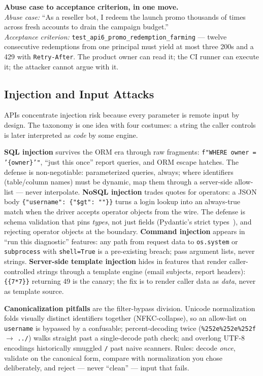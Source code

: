 \begin{examplebox}
\textbf{Abuse case to acceptance criterion, in one move.}\\
\emph{Abuse case:} ``As a reseller bot, I redeem the launch promo
thousands of times across fresh accounts to drain the campaign budget.''\\
\emph{Acceptance criterion:} \texttt{test\_api6\_promo\_redemption\_farming}
--- twelve consecutive redemptions from one principal must yield at most
three 200s and a 429 with \texttt{Retry-After}. The product owner can read
it; the CI runner can execute it; the attacker cannot argue with it.
\end{examplebox}

\subsection{Injection and Input Attacks}
\label{sec:ch16-injection}

APIs concentrate injection risk because every parameter is remote input by
design. The taxonomy is one idea with four costumes: a string the caller
controls is later interpreted as \emph{code} by some engine.

\textbf{SQL injection} survives the ORM era through raw fragments:
\texttt{f"WHERE owner = '\{owner\}'"}, ``just this once'' report queries,
and ORM escape hatches. The defense is non-negotiable: parameterized
queries, always; where identifiers (table/column names) must be dynamic,
map them through a server-side allow-list --- never interpolate.
\textbf{NoSQL injection} trades quotes for operators: a JSON body
\texttt{\{"username": \{"\$gt": ""\}\}} turns a login lookup into an
always-true match when the driver accepts operator objects from the wire.
The defense is schema validation that pins \emph{types}, not just fields
(Pydantic's strict types~\cite{pydanticdocs}), and rejecting operator
objects at the boundary. \textbf{Command injection} appears in ``run this
diagnostic'' features: any path from request data to \texttt{os.system} or
\texttt{subprocess} with \texttt{shell=True} is a pre-existing breach;
pass argument lists, never strings. \textbf{Server-side template injection}
hides in features that render caller-controlled strings through a template
engine (email subjects, report headers): \texttt{\{\{7*7\}\}} returning 49
is the canary; the fix is to render caller data as \emph{data}, never as
template source.

\textbf{Canonicalization pitfalls} are the filter-bypass division. Unicode
normalization folds visually distinct identifiers together
(NFKC-collapse), so an allow-list on \texttt{username} is bypassed by a
confusable; percent-decoding twice (\texttt{\%252e\%252e\%252f} $\to$
\texttt{../}) walks straight past a single-decode path check; and
overlong UTF-8 encodings historically smuggled \texttt{/} past naive
scanners. Rules: decode \emph{once}, validate on the canonical form,
compare with normalization you chose deliberately, and reject ---
never ``clean'' --- input that fails.

